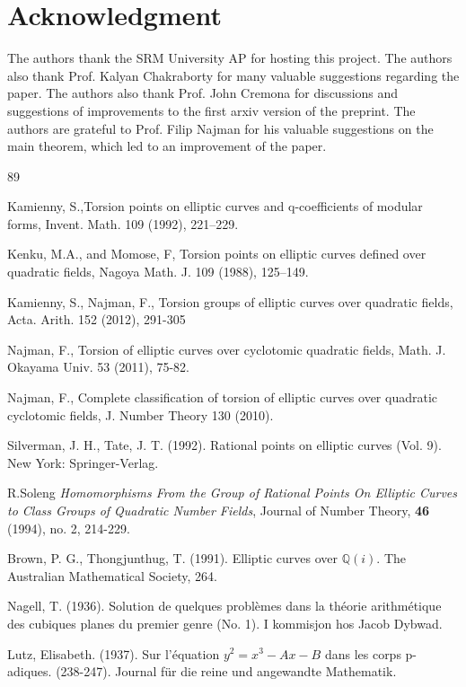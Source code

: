 \documentclass[12pt,leqno]{amsart}
\newcommand{\<}{\langle}
\renewcommand{\>}{\rangle}
\theoremstyle{definition}
\numberwithin{equation}{section}
\begin{document}
\section{Acknowledgment}

The authors thank the SRM University AP for hosting this project. The authors also thank Prof. Kalyan Chakraborty for many valuable suggestions regarding the paper. The authors also thank Prof. John Cremona for discussions and suggestions of improvements to the first arxiv version of the preprint. The authors are grateful to Prof. Filip Najman for his valuable suggestions on the main theorem, which led to an improvement of the paper.


%
%






\begin{thebibliography}{89}

 Kamienny, S.,Torsion points on elliptic curves and q-coefficients of modular forms, Invent. Math. 109 (1992), 221–229.

 Kenku, M.A., and  Momose, F, Torsion points on elliptic curves defined over quadratic fields, Nagoya Math. J. 109 (1988), 125–149.

 Kamienny, S., Najman, F., Torsion groups of elliptic curves over quadratic fields, Acta. Arith. 152 (2012), 291-305

  Najman, F., Torsion of elliptic curves over cyclotomic quadratic fields, Math. J. Okayama Univ. 53 (2011), 75-82.

 Najman, F., Complete classiﬁcation of torsion of elliptic curves over quadratic cyclotomic ﬁelds, J. Number Theory 130 (2010).

Silverman, J. H.,  Tate, J. T. (1992). Rational points on elliptic curves (Vol. 9). New York: Springer-Verlag.

 R.Soleng \textit{ Homomorphisms From the Group of Rational Points On Elliptic Curves to Class Groups of Quadratic Number Fields}, Journal of Number Theory, \textbf{46} (1994), no. 2, 214-229. 

Brown, P. G.,  Thongjunthug, T. (1991). Elliptic curves over $\mathbb{Q} (i)$. The Australian Mathematical Society, 264.

 Nagell, T. (1936). Solution de quelques problèmes dans la théorie arithmétique des cubiques planes du premier genre (No. 1). I kommisjon hos Jacob Dybwad.

 Lutz, Elisabeth. (1937). Sur l'équation $y^2 = x^3 - Ax - B$ dans les corps p-adiques. (238-247). Journal für die reine und angewandte Mathematik. 




\end{thebibliography} 
    
\end{document}
